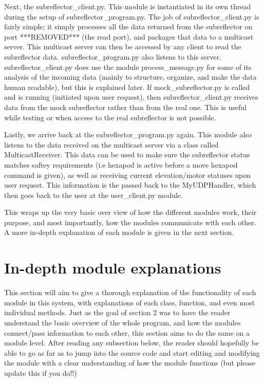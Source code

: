 \documentclass{article}
\begin{document}
Next, the subreflector\_client.py. This module is instantiated in its own thread  during the setup of subreflector\_program.py.  The job of subreflector\_client.py is fairly simple; it simply  processes all the data returned from the subreflector on port ***REMOVED*** (the read port), and packages that data to a multicast server. This multicast server can then be accessed by any client to read the subreflector data. subreflector\_program.py also listens to this server. subreflector\_client.py does use the module process\_message.py for some of its analysis of the incoming data (mainly to structure, organize, and make the data human readable), but this is explained later. If mock\_subreflector.py is called and is running (initiated upon user request), then subreflector\_client.py receives data from the mock subreflector rather than from the real one. This is useful while testing or when access to the real subreflector is not possible. 

\vspace{10pt}

Lastly, we arrive back at the subreflector\_program.py again. This module also listens to the data received on the multicast server via a class called MulticastReceiver. This data can be used to make sure the subreflector status matches saftey requirements  (i.e hexapod is active before a move hexapod command is given), as well as receiving current elevation/motor statuses upon user request. This information is the passed back to the MyUDPHandler, which then goes back to the user at the user\_client.py module.

\vspace{10pt}

This wraps up the very basic over view of how the different modules work, their purpose, and most importantly, how the modules communicate with each other. A  more in-depth explanation of each module is given in the next section. 




\newpage
\section{In-depth module explanations}

This section will aim to give a thorough  explanation of the functionality of each module in this system, with explanations of each class, function, and even most individual methods.  Just as the goal of section 2 was to have the reader understand the basic overview of the whole program, and how the modules connect/pass information to each other, this section aims to do the same on a module level. After reading any subsection below, the reader should hopefully be able to go as far as to jump into the source code and start editing and modifying the module with a clear understanding of how the module functions (but please update this if you do!!)
\end{document}

